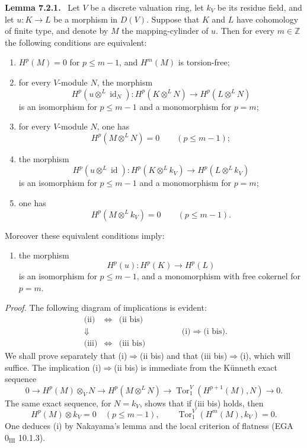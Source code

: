 \documentclass[11pt]{article}
\newenvironment{statement}[1]{\par\medskip\noindent\textbf{#1.}\ }{\par\medskip}
\begin{document}
\label{sga5:VII:lemma:7.2.1}\begin{statement}{Lemma 7.2.1}
Let $V$ be a discrete valuation ring, let $k_V$ be its residue field, and let $u:K\to L$ be a morphism in $D(V)$. Suppose that $K$ and $L$ have cohomology of finite type, and denote by $M$ the mapping-cylinder of $u$. Then for every $m\in\mathbb Z$ the following conditions are equivalent:
\begin{enumerate}[label=(\roman*)]
\item $H^p(M)=0$ for $p\le m-1$, and $H^m(M)$ is torsion-free;
\item for every $V$-module $N$, the morphism
\[
H^p(u\otimes^L\operatorname{id}_N):H^p(K\otimes^L N)\to H^p(L\otimes^L N)
\]
is an isomorphism for $p\le m-1$ and a monomorphism for $p=m$;
\item[(ii bis)] for every $V$-module $N$, one has
\[
H^p(M\otimes^L N)=0\qquad(p\le m-1);
\]
\item the morphism
\[
H^p(u\otimes^L\operatorname{id}):H^p(K\otimes^L k_V)\to H^p(L\otimes^L k_V)
\]
is an isomorphism for $p\le m-1$ and a monomorphism for $p=m$;
\item[(iii bis)] one has
\[
H^p(M\otimes^L k_V)=0\qquad(p\le m-1).
\]
\end{enumerate}
Moreover these equivalent conditions imply:
\begin{enumerate}[label=(\roman* bis)]
\item the morphism
\[
H^p(u):H^p(K)\to H^p(L)
\]
is an isomorphism for $p\le m-1$, and a monomorphism with free cokernel for $p=m$.
\end{enumerate}
\end{statement}

\emph{Proof.} The following diagram of implications is evident:
\[
\begin{array}{ccc}
\text{(ii)}&\Leftrightarrow&\text{(ii bis)}\\
\Downarrow&&\\
\text{(iii)}&\Leftrightarrow&\text{(iii bis)}
\end{array}
\qquad\qquad
\text{(i)}\Rightarrow\text{(i bis).}
\]
We shall prove separately that (i)$\Rightarrow$(ii bis) and that (iii bis)$\Rightarrow$(i), which will suffice. The implication (i)$\Rightarrow$(ii bis) is immediate from the Künneth exact sequence
\[
0\to H^p(M)\otimes_V N\to H^p(M\otimes^L N)\to \operatorname{Tor}_1^V(H^{p+1}(M),N)\to0.
\]
The same exact sequence, for $N=k_V$, shows that if (iii bis) holds, then
\[
H^p(M)\otimes k_V=0\quad(p\le m-1),\qquad
\operatorname{Tor}_1^V(H^m(M),k_V)=0.
\]
One deduces (i) by Nakayama's lemma and the local criterion of flatness (EGA $0_{\mathrm{III}}$ 10.1.3).
\end{document}
